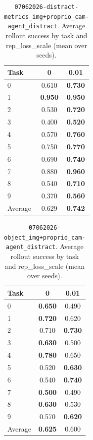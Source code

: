 \begin{table}
\caption{\texttt{07062026-distract-metrics\_img+proprio\_cam-agent\_distract}. Average rollout success by task and rep\_loss\_scale (mean over seeds).}
\label{tab:07062026_distract_metrics_img_proprio_cam_agent_distract_rep_loss_success}
\begin{tabular}{lcc}
\toprule
Task & 0 & 0.01 \\
\midrule
0 & 0.610 & \textbf{0.730} \\
1 & \textbf{0.950} & \textbf{0.950} \\
2 & 0.530 & \textbf{0.720} \\
3 & 0.400 & \textbf{0.520} \\
4 & 0.570 & \textbf{0.760} \\
5 & 0.750 & \textbf{0.770} \\
6 & 0.690 & \textbf{0.740} \\
7 & 0.880 & \textbf{0.960} \\
8 & 0.540 & \textbf{0.710} \\
9 & 0.370 & \textbf{0.560} \\
\midrule
Average & 0.629 & \textbf{0.742} \\
\bottomrule
\end{tabular}
\end{table}



\begin{table}
\caption{\texttt{07062026-object\_img+proprio\_cam-agent\_distract}. Average rollout success by task and rep\_loss\_scale (mean over seeds).}
\label{tab:07062026_object_img_proprio_cam_agent_distract_rep_loss_success}
\begin{tabular}{lcc}
\toprule
Task & 0 & 0.01 \\
\midrule
0 & \textbf{0.650} & 0.490 \\
1 & \textbf{0.720} & 0.620 \\
2 & 0.710 & \textbf{0.730} \\
3 & \textbf{0.630} & 0.500 \\
4 & \textbf{0.780} & 0.650 \\
5 & 0.520 & \textbf{0.630} \\
6 & 0.540 & \textbf{0.740} \\
7 & \textbf{0.500} & 0.490 \\
8 & \textbf{0.630} & 0.530 \\
9 & 0.570 & \textbf{0.620} \\
\midrule
Average & \textbf{0.625} & 0.600 \\
\bottomrule
\end{tabular}
\end{table}


